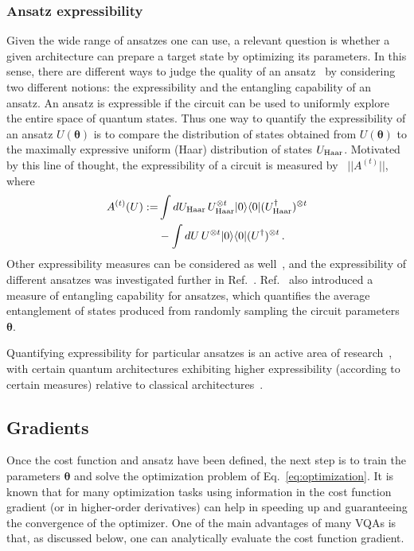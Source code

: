 \documentclass[prx,twocolumn,floatfix,superscriptaddress,longbibliography]{revtex4-1}
\renewcommand{\vec}[1]{\boldsymbol{#1}}  %
\newcommand{\<}{\langle}
\renewcommand{\>}{\rangle}
\renewcommand{\vec}[1]{\boldsymbol{#1}}  %
\begin{document}
\subsubsection{ Ansatz expressibility}  Given the wide range of ansatzes one can use, a relevant question is whether a given architecture can prepare a target state by optimizing its parameters. In this sense,  there are different ways to judge the quality of an ansatz~\cite{sim2019expressibility} by considering two different notions: the expressibility and the entangling capability of an ansatz. An ansatz is expressible if the circuit can be used to uniformly explore the entire space of quantum states. Thus one way to quantify the expressibility of an ansatz $U(\vec{\theta})$ is to compare the distribution of states obtained from $U(\vec{\theta})$ to the maximally expressive uniform (Haar) distribution of states $U_{\rm Haar}$. Motivated by this line of thought, the expressibility of a circuit is measured by~\cite{sim2019expressibility} $|| A^{(t)} ||$, where 
\begin{align}
    A^{(t)}(U) :=& \int d U_{\rm Haar } \, U_{\rm Haar }^{\otimes t}  | 0 \rangle \langle 0 | (U_{\rm Haar }^\dagger)^{\otimes t}\nonumber\\& -  \int d U \, U^{\otimes t}  | 0 \rangle \langle 0 | (U^\dagger)^{\otimes t} \, .
\end{align}
Other expressibility measures can be considered as well~\cite{sim2019expressibility}, and the expressibility of different ansatzes was investigated further in Ref.~\cite{nakaji2020expressibility}. Ref.~\cite{sim2019expressibility} also introduced a measure of entangling capability for ansatzes, which quantifies the average entanglement of states produced from randomly sampling the circuit parameters $\vec{\theta}$.
    
Quantifying expressibility for particular ansatzes is an active area of research~\cite{sim2019expressibility,nakaji2020expressibility,schuld2020effect,abbas2020power,holmes2021connecting}, with certain quantum architectures exhibiting higher expressibility (according to certain measures) relative to classical architectures~\cite{abbas2020power}. 


\subsection{ Gradients}
\label{Sec2subSec:Gradients}

Once the cost function and ansatz have been defined, the next step is to train the parameters $\vec{\theta}$ and solve the optimization problem of Eq.~\eqref{eq:optimization}. It is known that for many optimization tasks using information in the cost function gradient (or in higher-order derivatives) can help in speeding up and guaranteeing the convergence of the optimizer. One of the main advantages of many VQAs is that, as discussed below, one  can analytically evaluate the cost function gradient. 
    
\end{document}
